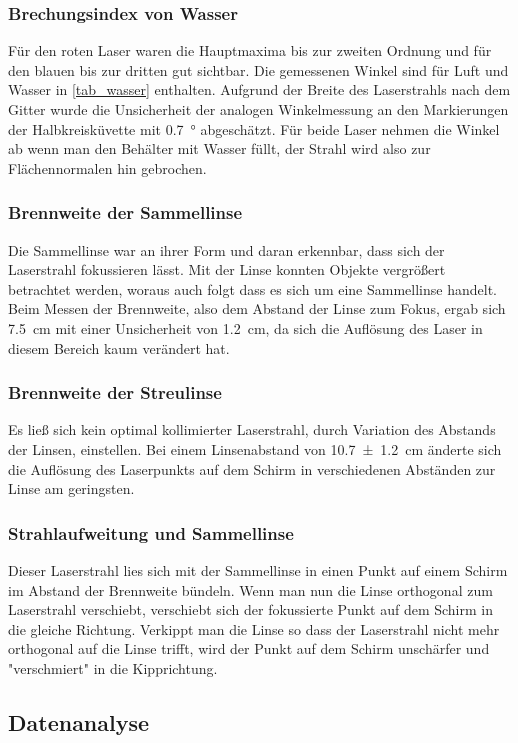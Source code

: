\documentclass[
	a4paper,
	12pt,
	pagesize,
	ngerman
]{scrartcl}
\begin{document}
	\subsubsection{Brechungsindex von Wasser}
	Für den roten Laser waren die Hauptmaxima bis zur zweiten Ordnung und für den blauen bis zur dritten gut sichtbar.
	Die gemessenen Winkel sind für Luft und Wasser in \cref{tab_wasser} enthalten.
	Aufgrund der Breite des Laserstrahls nach dem Gitter wurde die Unsicherheit der analogen Winkelmessung an den Markierungen der Halbkreisküvette mit \SI{0,7}{\degree} abgeschätzt.
	Für beide Laser nehmen die Winkel ab wenn man den Behälter mit Wasser füllt, der Strahl wird also zur Flächennormalen hin gebrochen.
	\subsubsection{Brennweite der Sammellinse}
	Die Sammellinse war an ihrer Form und daran erkennbar, dass sich der Laserstrahl fokussieren lässt.
	Mit der Linse konnten Objekte vergrößert betrachtet werden, woraus auch folgt dass es sich um eine Sammellinse handelt.
	Beim Messen der Brennweite, also dem Abstand der Linse zum Fokus, ergab sich \SI{7,5}{cm} mit einer Unsicherheit von \SI{1,2}{cm}, da sich die Auflösung des Laser in diesem Bereich kaum verändert hat. 
	\subsubsection{Brennweite der Streulinse}
	Es ließ sich kein optimal kollimierter Laserstrahl, durch Variation des Abstands der Linsen, einstellen.
	Bei einem Linsenabstand von \SI{10,7 +- 1,2}{cm} änderte sich die Auflösung des Laserpunkts auf dem Schirm in verschiedenen Abständen zur Linse am geringsten.
	\subsubsection{Strahlaufweitung und Sammellinse}
	Dieser Laserstrahl lies sich mit der Sammellinse in einen Punkt auf einem Schirm im Abstand der Brennweite bündeln.
	Wenn man nun die Linse orthogonal zum Laserstrahl verschiebt, verschiebt sich der fokussierte Punkt auf dem Schirm in die gleiche Richtung.
	Verkippt man die Linse so dass der Laserstrahl nicht mehr orthogonal auf die Linse trifft, wird der Punkt auf dem Schirm unschärfer und "verschmiert" in die Kipprichtung.

	\subsection{Datenanalyse}
\end{document}
